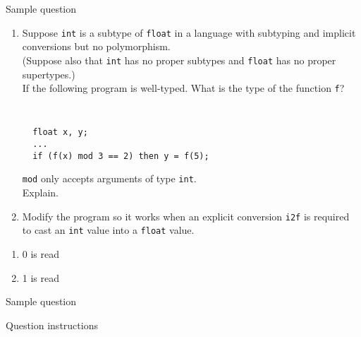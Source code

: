 \documentclass[11pt]{exam}
\begin{document}
\begin{questions}

	\question Sample question

        \begin{enumerate}[label=(\alph*)]
        \item Suppose {\tt int} is a subtype of {\tt float} in a language with subtyping
          and implicit conversions but no polymorphism. \\
          (Suppose also that {\tt int} has no proper subtypes and {\tt float} has no proper supertypes.)\\
          If the following program is well-typed. What is the type of the function {\tt f}?
          {\tt
\begin{lstlisting}
  float x, y;
  ...
  if (f(x) mod 3 == 2) then y = f(5);
\end{lstlisting}
          }
          {\tt mod} only accepts arguments of type {\tt int}.\\
          Explain.
        \item Modify the program so it works when an explicit conversion {\tt i2f} is required to cast an {\tt int} value into a {\tt float} value.

        \end{enumerate}

	\begin{framed}


	\end{framed}

        \begin{enumerate}[label=(\alph*)]
            \item 0 is read
                \begin{framed}
                \end{framed}

            \item 1 is read
                \begin{framed}
                \end{framed}
        \end{enumerate}


	\question Sample question


	\quad

	Question instructions

	\begin{framed}



\end{framed}
\end{questions}
\end{document}
